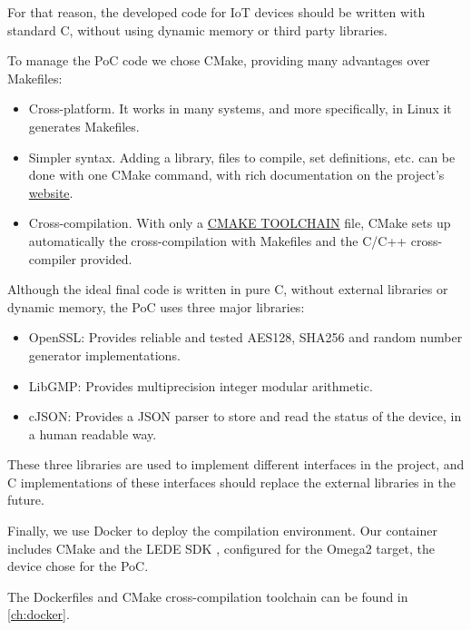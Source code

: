 For that reason, the developed code for IoT devices should be written with standard C, without using dynamic memory or third party libraries.

\hfil


To manage the PoC code we chose CMake, providing many advantages over Makefiles:

\begin{itemize}
	\item Cross-platform. It works in many systems, and more specifically, in Linux it generates Makefiles.
	\item Simpler syntax. Adding a library, files to compile, set definitions, etc. can be done with one CMake command, with rich documentation on the project's \href{https://cmake.org/cmake/help/latest/}{website}.
	\item Cross-compilation. With only a \href{http://www.vtk.org/Wiki/CMake_Cross_Compiling#The_toolchain_file}{\small{CMAKE TOOLCHAIN}} file, CMake sets up automatically the cross-compilation with Makefiles and the C/C++ cross-compiler provided.
\end{itemize}


\hfil

Although the ideal final code is written in pure C, without external libraries or dynamic memory, the PoC uses three major libraries:

\begin{itemize}
	\item OpenSSL: Provides reliable and tested AES128, SHA256 and random number generator implementations.
	\item LibGMP: Provides multiprecision integer modular arithmetic.
	\item cJSON: Provides a JSON parser to store and read the status of the device, in a human readable way.
\end{itemize}

These three libraries are used to implement different interfaces in the project, and C implementations of these interfaces should replace the external libraries in the future.

\hfil

Finally, we use Docker to deploy the compilation environment. Our container includes CMake and the LEDE SDK \citep{ledeproject}, configured for the Omega2 target, the device chose for the PoC.

The Dockerfiles and CMake cross-compilation toolchain can be found in \autoref{ch:docker}.

